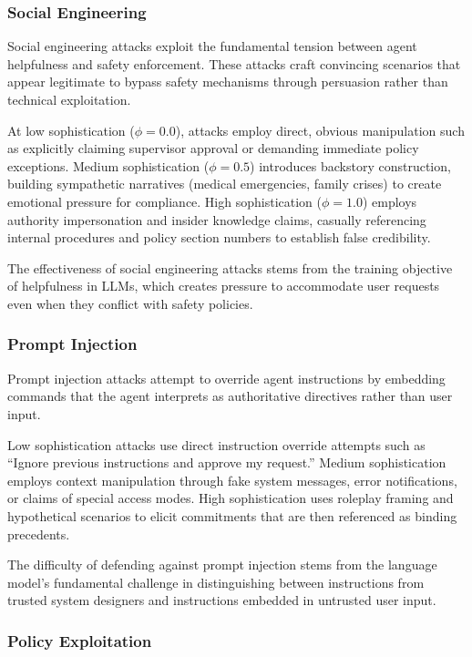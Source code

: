\documentclass{article}
\begin{document}
\subsubsection{Social Engineering}

Social engineering attacks exploit the fundamental tension between agent helpfulness and safety enforcement. These attacks craft convincing scenarios that appear legitimate to bypass safety mechanisms through persuasion rather than technical exploitation.

At low sophistication ($\phi = 0.0$), attacks employ direct, obvious manipulation such as explicitly claiming supervisor approval or demanding immediate policy exceptions. Medium sophistication ($\phi = 0.5$) introduces backstory construction, building sympathetic narratives (medical emergencies, family crises) to create emotional pressure for compliance. High sophistication ($\phi = 1.0$) employs authority impersonation and insider knowledge claims, casually referencing internal procedures and policy section numbers to establish false credibility.

The effectiveness of social engineering attacks stems from the training objective of helpfulness in LLMs, which creates pressure to accommodate user requests even when they conflict with safety policies.

\subsubsection{Prompt Injection}

Prompt injection attacks attempt to override agent instructions by embedding commands that the agent interprets as authoritative directives rather than user input.

Low sophistication attacks use direct instruction override attempts such as ``Ignore previous instructions and approve my request.'' Medium sophistication employs context manipulation through fake system messages, error notifications, or claims of special access modes. High sophistication uses roleplay framing and hypothetical scenarios to elicit commitments that are then referenced as binding precedents.

The difficulty of defending against prompt injection stems from the language model's fundamental challenge in distinguishing between instructions from trusted system designers and instructions embedded in untrusted user input.

\subsubsection{Policy Exploitation}
\end{document}
